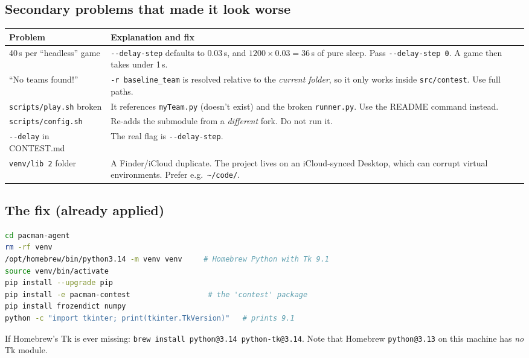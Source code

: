 \documentclass[11pt,a4paper]{article}
\begin{document}
\subsection{Secondary problems that made it look worse}
\begin{center}
\begin{tabularx}{\linewidth}{@{}lX@{}}
\toprule
\textbf{Problem} & \textbf{Explanation and fix} \\
\midrule
40\,s per ``headless'' game & \texttt{-{}-delay-step} defaults to 0.03\,s, and $1200 \times 0.03 = 36$\,s of pure sleep. Pass \texttt{-{}-delay-step 0}. A game then takes under 1\,s. \\
``No teams found!'' & \texttt{-r baseline\_team} is resolved relative to the \emph{current folder}, so it only works inside \texttt{src/contest}. Use full paths. \\
\texttt{scripts/play.sh} broken & It references \texttt{myTeam.py} (doesn't exist) and the broken \texttt{runner.py}. Use the README command instead. \\
\texttt{scripts/config.sh} & Re-adds the submodule from a \emph{different} fork. Do not run it. \\
\texttt{-{}-delay} in CONTEST.md & The real flag is \texttt{-{}-delay-step}. \\
\texttt{venv/lib 2} folder & A Finder/iCloud duplicate. The project lives on an iCloud-synced Desktop, which can corrupt virtual environments. Prefer e.g.\ \texttt{\textasciitilde/code/}. \\
\bottomrule
\end{tabularx}
\end{center}

\subsection{The fix (already applied)}
\begin{lstlisting}[language=bash]
cd pacman-agent
rm -rf venv
/opt/homebrew/bin/python3.14 -m venv venv     # Homebrew Python with Tk 9.1
source venv/bin/activate
pip install --upgrade pip
pip install -e pacman-contest                  # the 'contest' package
pip install frozendict numpy
python -c "import tkinter; print(tkinter.TkVersion)"   # prints 9.1
\end{lstlisting}
If Homebrew's Tk is ever missing: \texttt{brew install python@3.14 python-tk@3.14}.
Note that Homebrew \texttt{python@3.13} on this machine has \emph{no} Tk module.

\end{document}
